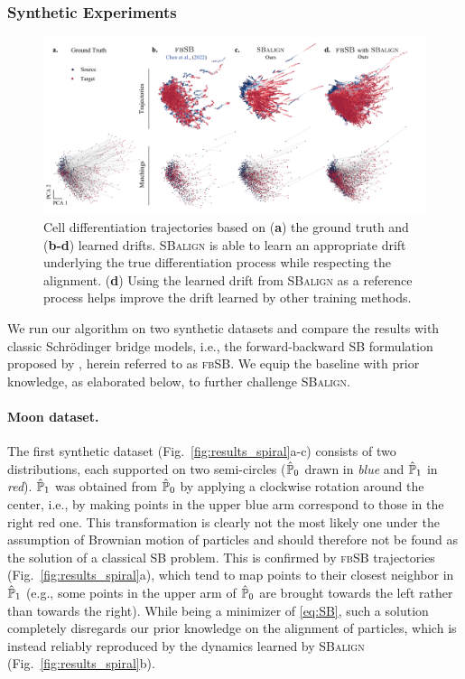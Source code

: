 \subsubsection{Synthetic Experiments}
\label{sec:synthetic}

\begin{figure}
    \centering
    \includegraphics[width=\textwidth]{figures/fig_cell_trajectories_matchings.pdf}
    \caption{Cell differentiation trajectories based on (\textbf{a}) the ground truth and (\textbf{b-d}) learned drifts. \textsc{SBalign} is able to learn an appropriate drift underlying the true differentiation process while respecting the alignment. (\textbf{d}) Using the learned drift from \textsc{SBalign} as a reference process helps improve the drift learned by other training methods.}
    \label{fig:results_cell_traj}
\end{figure}

We run our algorithm on two synthetic datasets and compare the results with classic Schr\"odinger bridge models, i.e., the forward-backward SB formulation proposed by \cite{chen2021likelihood}, herein referred to as \textsc{fbSB}. We equip the baseline with prior knowledge, as elaborated below, to further challenge \textsc{SBalign}.

\paragraph{Moon dataset.}
The first synthetic dataset (Fig.~\ref{fig:results_spiral}a-c) consists of two distributions, each supported on two semi-circles ($\hat{\mathbb{P}}_{ {0} }$ drawn in \textit{blue} and $\hat{\mathbb{P}}_{ {1}}$ in \textit{red}).
$\hat{\mathbb{P}}_{ {1}}$ was obtained from $\hat{\mathbb{P}}_{ {0} }$ by applying a clockwise rotation around the center, i.e., by making points in the upper blue arm correspond to those in the right red one.
This transformation is clearly not the most likely one under the assumption of Brownian motion of particles and should therefore not be found as the solution of a classical SB problem. 
This is confirmed by \textsc{fbSB} trajectories (Fig.~\ref{fig:results_spiral}a), which tend to map points to their closest neighbor in $\hat{\mathbb{P}}_{ {1}}$ (e.g., some points in the upper arm of $\hat{\mathbb{P}}_{ {0} }$ are brought towards the left rather than towards the right). 
While being a minimizer of \eqref{eq:SB}, such a solution completely disregards our prior knowledge on the alignment of particles, which is instead reliably reproduced by the dynamics learned by \textsc{SBalign} (Fig.~\ref{fig:results_spiral}b).

